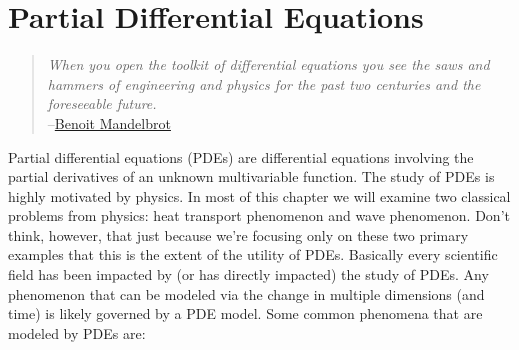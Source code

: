 \documentclass[
]{book}
\theoremstyle{definition}
\theoremstyle{definition}
\theoremstyle{definition}
\theoremstyle{remark}
\begin{document}
\hypertarget{ch:pdes}{%
\chapter{Partial Differential Equations}\label{ch:pdes}}

\begin{quote}
\emph{When you open the toolkit of differential equations you see the saws and hammers of engineering and physics for the past two centuries and the foreseeable future.}\\
--\href{https://en.wikipedia.org/wiki/Benoit_Mandelbrot}{Benoit Mandelbrot}
\end{quote}

Partial differential equations (PDEs) are differential equations involving the partial derivatives of an unknown multivariable function. The study of PDEs is highly motivated by physics. In most of this chapter we will examine two classical problems from physics: heat transport phenomenon and wave phenomenon. Don't think, however, that just because we're focusing only on these two primary examples that this is the extent of the utility of PDEs. Basically every scientific field has been impacted by (or has directly impacted) the study of PDEs. Any phenomenon that can be modeled via the change in multiple dimensions (and time) is likely governed by a PDE model. Some common phenomena that are modeled by PDEs are:
\end{document}
